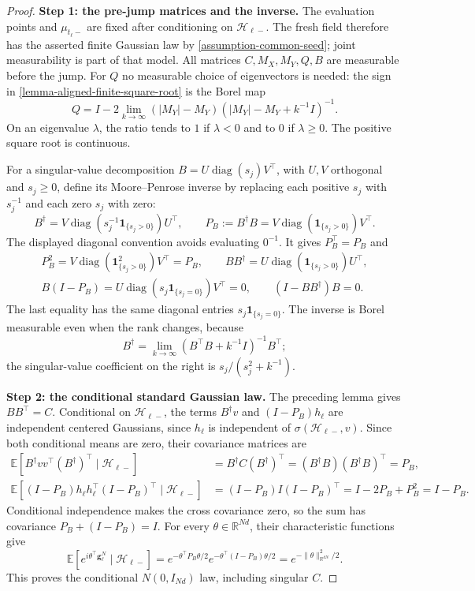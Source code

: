 \begin{proof}
\noindent\textbf{Step 1: the pre-jump matrices and the inverse.}
The evaluation points and $\mu_{t_\ell-}$ are fixed after conditioning on
$\mathcal H_{\ell-}$. The fresh field therefore has the asserted finite
Gaussian law by \cref{assumption-common-seed}; joint measurability is part
of that model. All matrices $C,M_X,M_Y,Q,B$ are measurable before the
jump. For $Q$ no measurable choice of eigenvectors is needed: the sign in
\cref{lemma-aligned-finite-square-root} is the Borel map
\[
 Q=I-2\lim_{k\to\infty}
 (|M_Y|-M_Y)(|M_Y|-M_Y+k^{-1}I)^{-1}.
\]
On an eigenvalue $\lambda$, the ratio tends to $1$ if $\lambda<0$ and
to $0$ if $\lambda\ge0$. The positive square root is continuous.

For a singular-value decomposition $B=U\operatorname{diag}(s_j)V^\top$,
with $U,V$ orthogonal and $s_j\ge0$,
define its Moore--Penrose inverse by replacing each positive $s_j$ with
$s_j^{-1}$ and each zero $s_j$ with zero:
\[
 B^\dagger=V\operatorname{diag}(s_j^{-1}\mathbf1_{\{s_j>0\}})U^\top,
 \qquad
 P_B:=B^\dagger B
 =V\operatorname{diag}(\mathbf1_{\{s_j>0\}})V^\top.
\]
The displayed diagonal convention avoids evaluating $0^{-1}$.
It gives $P_B^\top=P_B$ and
\[
\begin{gathered}
 P_B^2=V\operatorname{diag}(\mathbf1_{\{s_j>0\}}^2)V^\top=P_B,
 \qquad BB^\dagger=U\operatorname{diag}(\mathbf1_{\{s_j>0\}})U^\top,\\
 B(I-P_B)=U\operatorname{diag}(s_j\mathbf1_{\{s_j=0\}})V^\top=0,
 \qquad (I-BB^\dagger)B=0.
\end{gathered}
\]
The last equality has the same diagonal entries $s_j\mathbf1_{\{s_j=0\}}$. The inverse is Borel measurable even when the rank
changes, because
\[
 B^\dagger=\lim_{k\to\infty}(B^\top B+k^{-1}I)^{-1}B^\top;
\]
the singular-value coefficient on the right is $s_j/(s_j^2+k^{-1})$.

\par\noindent\textbf{Step 2: the conditional standard Gaussian law.}
The preceding lemma gives $BB^\top=C$. Conditional on $\mathcal H_{\ell-}$,
the terms $B^\dagger v$ and $(I-P_B)h_\ell$ are independent centered
Gaussians, since $h_\ell$ is independent of $\sigma(\mathcal H_{\ell-},v)$.
Since both conditional means are zero, their covariance matrices are
\begin{equation}
\label{eq:population-whitening-covariances}
\begin{aligned}
 \mathbb E[B^\dagger vv^\top(B^\dagger)^\top\mid\mathcal H_{\ell-}]
 &=B^\dagger C(B^\dagger)^\top
 =(B^\dagger B)(B^\dagger B)^\top=P_B,\\
 \mathbb E[(I-P_B)h_\ell h_\ell^\top(I-P_B)^\top\mid\mathcal H_{\ell-}]
 &=(I-P_B)I(I-P_B)^\top=I-2P_B+P_B^2=I-P_B.
\end{aligned}
\end{equation}
Conditional independence makes the cross covariance zero, so the sum
has covariance $P_B+(I-P_B)=I$.
For every $\theta\in\mathbb R^{Nd}$, their characteristic functions give
\[
 \mathbb E[e^{i\theta^\top\mathbf g_\ell^N}\mid\mathcal H_{\ell-}]
 =e^{-\theta^\top P_B\theta/2}
    e^{-\theta^\top(I-P_B)\theta/2}
 =e^{-\|\theta\|_{\mathbb R^{dN}}^2/2}.
\]
This proves the conditional $N(0,I_{Nd})$ law, including singular $C$.


\end{proof}
